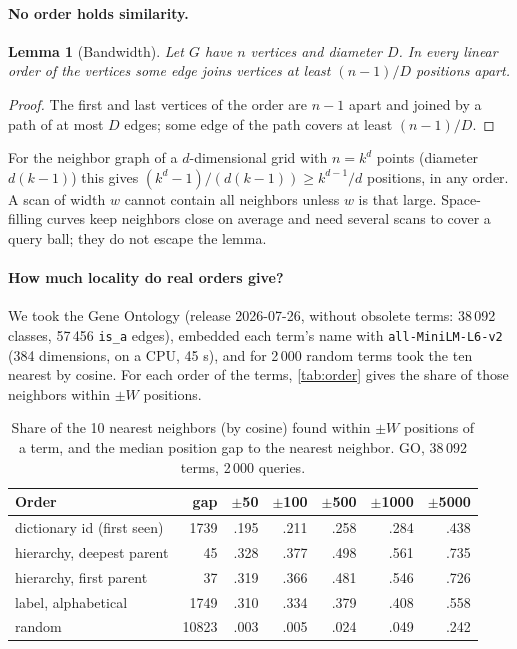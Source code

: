 \documentclass[sigconf, nonacm]{acmart}
\newcommand{\code}[1]{\texttt{#1}}
\newtheorem{lemma}{Lemma}
\begin{document}
\paragraph{No order holds similarity.}

\begin{lemma}[Bandwidth]\label{lem:bw}
Let $G$ have $n$ vertices and diameter $D$. In every linear order of the vertices some edge joins vertices at least $(n-1)/D$ positions apart.
\end{lemma}
\begin{proof}
The first and last vertices of the order are $n-1$ apart and joined by a path of at most $D$ edges; some edge of the path covers at least $(n-1)/D$.
\end{proof}

For the neighbor graph of a $d$-dimensional grid with $n=k^d$ points (diameter $d(k-1)$) this gives $(k^d-1)/(d(k-1)) \ge k^{d-1}/d$ positions, in any order. A scan of width $w$ cannot contain all neighbors unless $w$ is that large. Space-filling curves keep neighbors close on average and need several scans to cover a query ball; they do not escape the lemma.

\paragraph{How much locality do real orders give?} We took the Gene Ontology (release 2026-07-26, without obsolete terms: 38\,092 classes, 57\,456 \code{is\_a} edges), embedded each term's name with \code{all-MiniLM-L6-v2}~\cite{reimers2019} (384 dimensions, on a CPU, 45 s), and for 2\,000 random terms took the ten nearest by cosine. For each order of the terms, \autoref{tab:order} gives the share of those neighbors within $\pm W$ positions.

\begin{table}[t]
\caption{Share of the 10 nearest neighbors (by cosine) found within $\pm W$ positions of a term, and the median position gap to the nearest neighbor. GO, 38\,092 terms, 2\,000 queries.}
\label{tab:order}
\small
\begin{tabular}{@{}lrrrrrr@{}}
\toprule
Order & gap & $\pm$50 & $\pm$100 & $\pm$500 & $\pm$1000 & $\pm$5000 \\
\midrule
dictionary id (first seen) & 1739 & .195 & .211 & .258 & .284 & .438 \\
hierarchy, deepest parent & 45 & .328 & .377 & .498 & .561 & .735 \\
hierarchy, first parent & 37 & .319 & .366 & .481 & .546 & .726 \\
label, alphabetical & 1749 & .310 & .334 & .379 & .408 & .558 \\
random & 10823 & .003 & .005 & .024 & .049 & .242 \\
\bottomrule
\end{tabular}
\end{table}
\end{document}
